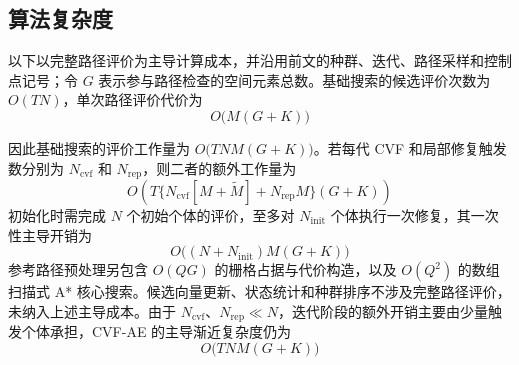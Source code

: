 \subsection{算法复杂度}

以下以完整路径评价为主导计算成本，并沿用前文的种群、迭代、路径采样和控制点记号；令 $G$ 表示参与路径检查的空间元素总数。基础搜索的候选评价次数为 $O(TN)$，单次路径评价代价为
\begin{equation}
    O\big(M(G+K)\big)
\end{equation}

因此基础搜索的评价工作量为 $O\big(TNM(G+K)\big)$。若每代 CVF 和局部修复触发数分别为 $N_{\mathrm{cvf}}$ 和 $N_{\mathrm{rep}}$，则二者的额外工作量为
\begin{equation}
    O\!\left(
    T\{N_{\mathrm{cvf}}[M+\widetilde M]+N_{\mathrm{rep}}M\}(G+K)
    \right)
\end{equation}
初始化时需完成 $N$ 个初始个体的评价，至多对 $N_{\mathrm{init}}$ 个体执行一次修复，其一次性主导开销为
\begin{equation}
O\bigl((N+N_{\mathrm{init}})M(G+K)\bigr)
\label{eq:initialization-complexity}
\end{equation}
参考路径预处理另包含 $O(QG)$ 的栅格占据与代价构造，以及 $O(Q^2)$ 的数组扫描式 A* 核心搜索。候选向量更新、状态统计和种群排序不涉及完整路径评价，未纳入上述主导成本。由于 $N_{\mathrm{cvf}}$、$N_{\mathrm{rep}}\ll N$，迭代阶段的额外开销主要由少量触发个体承担，CVF-AE 的主导渐近复杂度仍为
\begin{equation}
O\bigl(TNM(G+K)\bigr)
\label{eq:dominant-complexity}
\end{equation}

